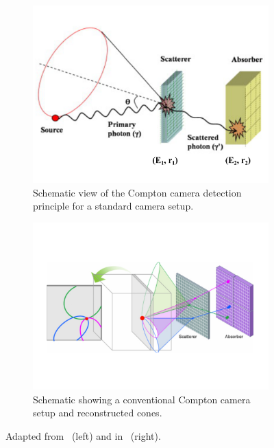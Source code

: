 \begin{figure}
\centering
\begin{subfigure}[t]{.49\textwidth}
\includegraphics[width=1.0\linewidth]{03_GraphicFiles/chapter2_GammaCameras/ComptonCamera_principle.png}
\caption{Schematic view of the Compton camera detection principle for a standard camera setup.}
\label{chap2::fig::CC_detPrinciple}
\end{subfigure}
\begin{subfigure}[t]{.49\textwidth}
\includegraphics[width=1.0\linewidth]{03_GraphicFiles/chapter2_GammaCameras/Compton_cones.pdf}
\caption{Schematic showing a conventional Compton camera setup and reconstructed cones.}
\label{chap2::fig::CC_cones}
\end{subfigure}
\caption{Adapted from~\cite{Seo2010} (left) and in~\cite{Kim2013} (right).}
\label{chap2::fig::CC_basics}
\end{figure}

